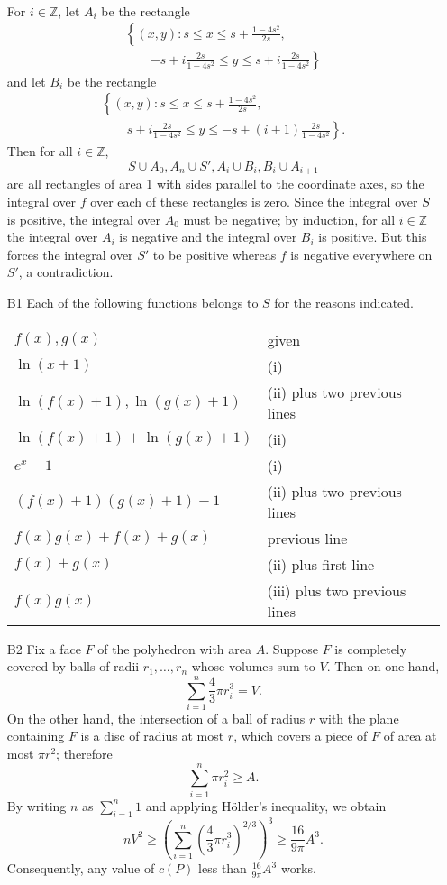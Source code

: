 \documentclass[amssymb,twocolumn,pra,10pt,aps]{revtex4-1}
\newcommand{\ZZ}{\mathbb{Z}}
\begin{document}
\begin{itemize}
For $i \in \ZZ$, let $A_i$ be the rectangle
\begin{multline*}
\left\{(x,y): s \leq x \leq s + \frac{1-4s^2}{2s},\right. \\
\qquad \left. -s+i \frac{2s}{1-4s^2} \leq y \leq s + i \frac{2s}{1-4s^2} \right\}
\end{multline*}
and let $B_i$ be the rectangle
\begin{multline*}
\left\{(x,y): s \leq x \leq s + \frac{1-4s^2}{2s}, \right.  \\
\qquad \left. s+i \frac{2s}{1-4s^2} \leq y \leq -s + (i+1) \frac{2s}{1-4s^2} \right\}.
\end{multline*}
Then for all $i \in \ZZ$,
\[
S \cup A_0, A_n \cup S', A_i \cup B_i, B_i \cup A_{i+1}
\]
are all rectangles of area 1 with sides parallel to the coordinate axes,
so the integral over $f$ over each of these rectangles is zero.
Since the integral over $S$ is positive, the integral over $A_0$ must be negative; by induction, for all $i \in \ZZ$ the integral over $A_i$ is negative and the integral over $B_i$ is positive. But this forces the integral over $S'$ to be positive whereas $f$ is negative everywhere on $S'$, a contradiction.

\item[B1]
Each of the following functions belongs to $S$ for the reasons indicated.
\begin{center}
\begin{tabular}{ll}
$f(x), g(x)$ & given \\
$\ln(x+1)$ & (i) \\
$\ln(f(x)+1), \ln(g(x)+1)$ & (ii) plus two previous lines\\
$\ln(f(x)+1) + \ln(g(x)+1)$ & (ii) \\
$e^x - 1$ & (i) \\
$(f(x)+1)(g(x)+1) - 1$ & (ii) plus two previous lines \\
$f(x)g(x) + f(x) + g(x)$ & previous line \\
$f(x) + g(x)$ & (ii) plus first line \\
$f(x) g(x)$ & (iii) plus two previous lines
\end{tabular}
\end{center}

\item[B2]
Fix a face $F$ of the polyhedron with area $A$. Suppose $F$ is completely covered by balls of radii
$r_1, \dots, r_n$ whose volumes sum to $V$. Then on one hand,
\[
\sum_{i=1}^n \frac{4}{3} \pi r_i^3 = V.
\]
On the other hand, the intersection of a ball of radius $r$ with the plane containing $F$ is a
disc of radius at most $r$, which covers a piece of $F$ of area at most $\pi r^2$; therefore
\[
\sum_{i=1}^n \pi r_i^2 \geq A.
\]
By writing $n$ as $\sum_{i=1}^n 1$ and applying H\"older's inequality,
we obtain
\[
n V^2 \geq \left( \sum_{i=1}^n \left( \frac{4}{3} \pi r_i^3 \right)^{2/3} \right)^3
\geq \frac{16}{9\pi} A^3.
\]
Consequently, any value of $c(P)$ less than $\frac{16}{9\pi} A^3$ works.


\end{itemize}
\end{document}
